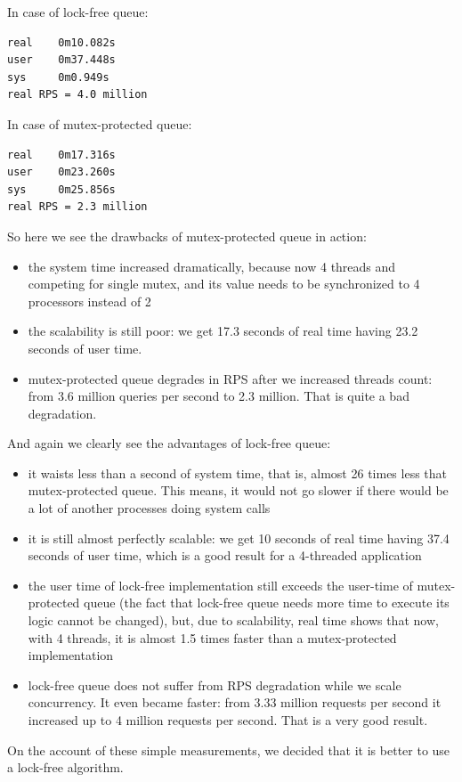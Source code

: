 \documentclass{article}
\begin{document}
In case of lock-free queue:
\begin{lstlisting}
real    0m10.082s
user    0m37.448s
sys     0m0.949s
real RPS = 4.0 million
\end{lstlisting}

In case of mutex-protected queue:
\begin{lstlisting}
real    0m17.316s
user    0m23.260s
sys     0m25.856s
real RPS = 2.3 million
\end{lstlisting}

So here we see the drawbacks of mutex-protected queue in action:
\begin{itemize}
	\item the system time increased dramatically, because now 4 threads and competing for single mutex, and its value needs to be synchronized to 4 processors instead of 2
	\item the scalability is still poor: we get 17.3 seconds of real time having 23.2 seconds of user time.
	\item mutex-protected queue degrades in RPS after we increased threads count: from 3.6 million queries per second to 2.3 million. That is quite a bad degradation.
\end{itemize}

And again we clearly see the advantages of lock-free queue:
\begin{itemize}
	\item it waists less than a second of system time, that is, almost 26 times less that mutex-protected queue. This means, it would not go slower if there would be a lot of another processes doing system calls
	\item it is still almost perfectly scalable: we get 10 seconds of real time having 37.4 seconds of user time, which is a good result for a 4-threaded application
	\item the user time of lock-free implementation still exceeds the user-time of mutex-protected queue (the fact that lock-free queue needs more time to execute its logic cannot be changed), but, due to scalability, real time shows that now, with 4 threads, it is almost 1.5 times faster than a mutex-protected implementation
	\item lock-free queue does not suffer from RPS degradation while we scale concurrency. It even became faster: from 3.33 million requests per second it increased up to 4 million requests per second. That is a very good result.
\end{itemize}

On the account of these simple measurements, we decided that it is better to use a lock-free algorithm.
\end{document}
